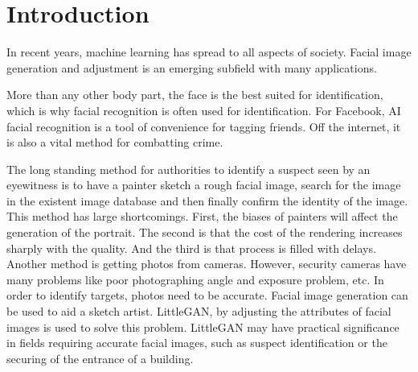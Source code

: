 \section{Introduction}
In recent years, machine learning has spread to all aspects of society.
Facial image generation and adjustment is an emerging subfield with many applications.


More than any other body part, the face is the best suited for identification,
    which is why facial recognition is often used for identification.
For Facebook, AI facial recognition is a tool of convenience for tagging friends.
Off the internet, it is also a vital method for combatting crime.


The long standing method for authorities to identify a suspect seen by an eyewitness is to have a painter sketch a rough facial image,
    search for the image in the existent image database and then finally confirm the identity of the image.
This method has large shortcomings.
First, the biases of painters will affect the generation of the portrait.
The second is that the cost of the rendering increases sharply with the quality.
And the third is that process is filled with delays.
Another method is getting photos from cameras.
However, security cameras have many problems like poor photographing angle and exposure problem, etc.
In order to identify targets, photos need to be accurate.
Facial image generation can be used to aid a sketch artist.
LittleGAN, by adjusting the attributes of facial images is used to solve this problem.
LittleGAN may have practical significance in fields requiring accurate facial images,
    such as suspect identification or the securing of the entrance of a building.